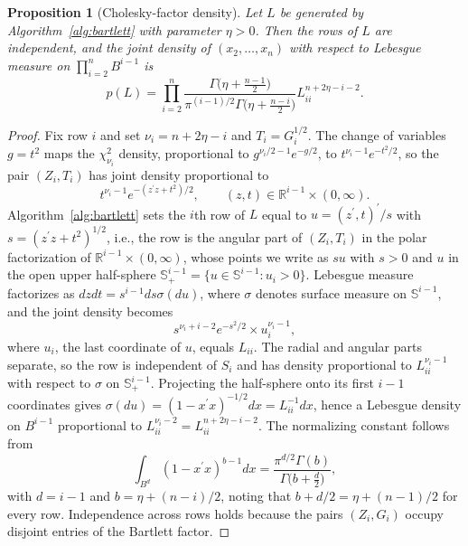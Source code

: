 \documentclass[10pt,a4paper]{amsart}
\newtheorem{proposition}{Proposition}
\begin{document}
\begin{proposition}[Cholesky-factor density]
\label{prop:cholesky_density}
Let $L$ be generated by Algorithm~\ref{alg:bartlett} with parameter $\eta>0$. Then the rows of $L$ are independent, and the joint density of $(x_2,\ldots,x_n)$ with respect to Lebesgue measure on $\prod_{i=2}^n B^{i-1}$ is
$$
p(L)=\prod_{i=2}^n
\frac{\Gamma\bigl(\eta+\frac{n-1}{2}\bigr)}{\pi^{(i-1)/2}\Gamma\bigl(\eta+\frac{n-i}{2}\bigr)}
L_{ii}^{n+2\eta-i-2}.
$$
\end{proposition}

\begin{proof}
Fix row $i$ and set $\nu_i=n+2\eta-i$ and $T_i=G_i^{1/2}$. The change of variables $g=t^2$ maps the $\chi^2_{\nu_i}$ density, proportional to $g^{\nu_i/2-1}e^{-g/2}$, to $t^{\nu_i-1}e^{-t^2/2}$, so the pair $(Z_i,T_i)$ has joint density proportional to
$$
t^{\nu_i-1}e^{-(z^\prime z+t^2)/2},
\qquad
(z,t)\in\mathbb{R}^{i-1}\times(0,\infty).
$$
Algorithm~\ref{alg:bartlett} sets the $i$th row of $L$ equal to $u=(z^\prime,t)^\prime/s$ with $s=(z^\prime z+t^2)^{1/2}$, i.e., the row is the angular part of $(Z_i,T_i)$ in the polar factorization of $\mathbb{R}^{i-1}\times(0,\infty)$, whose points we write as $su$ with $s>0$ and $u$ in the open upper half-sphere $\mathbb{S}^{i-1}_+=\{u\in \mathbb{S}^{i-1}:u_i>0\}$. Lebesgue measure factorizes as $dzdt=s^{i-1}ds\sigma(du)$, where $\sigma$ denotes surface measure on $\mathbb{S}^{i-1}$, and the joint density becomes
$$
s^{\nu_i+i-2}e^{-s^2/2}\times u_i^{\nu_i-1},
$$
where $u_i$, the last coordinate of $u$, equals $L_{ii}$. The radial and angular parts separate, so the row is independent of $S_i$ and has density proportional to $L_{ii}^{\nu_i-1}$ with respect to $\sigma$ on $\mathbb{S}^{i-1}_+$. Projecting the half-sphere onto its first $i-1$ coordinates gives $\sigma(du)=(1-x^\prime x)^{-1/2}dx=L_{ii}^{-1}dx$, hence a Lebesgue density on $B^{i-1}$ proportional to $L_{ii}^{\nu_i-2}=L_{ii}^{n+2\eta-i-2}$. The normalizing constant follows from
$$
\int_{B^{d}}(1-x^\prime x)^{b-1}dx=\frac{\pi^{d/2}\Gamma(b)}{\Gamma\bigl(b+\frac{d}{2}\bigr)},
$$
with $d=i-1$ and $b=\eta+(n-i)/2$, noting that $b+d/2=\eta+(n-1)/2$ for every row. Independence across rows holds because the pairs $(Z_i,G_i)$ occupy disjoint entries of the Bartlett factor.
\end{proof}
\end{document}
